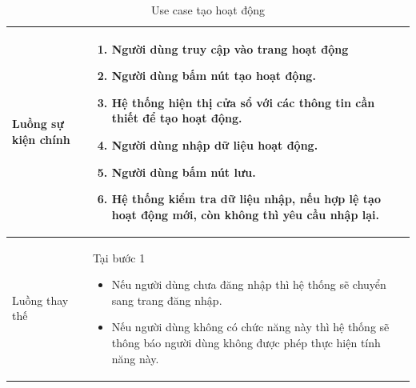 \documentclass[12pt,a4paper]{article}
\begin{document}
\begin{table}[H]
\begin{tabular}{|p{3.5cm}|p{11.5cm}|c|}
            Luồng sự kiện chính & \vspace{-.8cm}\begin{enumerate}
                                                    \item Người dùng truy cập vào trang hoạt động
                                                    \item  Người dùng bấm nút tạo hoạt động.
                                                    \item  Hệ thống hiện thị cửa sổ với các thông tin cần thiết để tạo hoạt động.
                                                    \item  Người dùng nhập dữ liệu hoạt động.
                                                    \item Người dùng bấm nút lưu.
                                                    \item Hệ thống kiểm tra dữ liệu nhập, nếu hợp lệ tạo hoạt động mới, còn không thì yêu cầu nhập lại.
            \end{enumerate}
            \\
            \hline
            Luồng thay thế & Tại bước 1\newline
            \vspace{-.8cm}\begin{itemize}
                              \item Nếu người dùng chưa đăng nhập thì hệ thống sẽ chuyển sang trang đăng nhập.
                              \item  Nếu người dùng không có chức năng này thì hệ thống sẽ thông báo người dùng không được phép thực hiện tính năng này.
            \end{itemize}
            \\
            \hline
        \end{tabular}
        \caption{Use case tạo hoạt động}
    \end{table}


\end{document}
